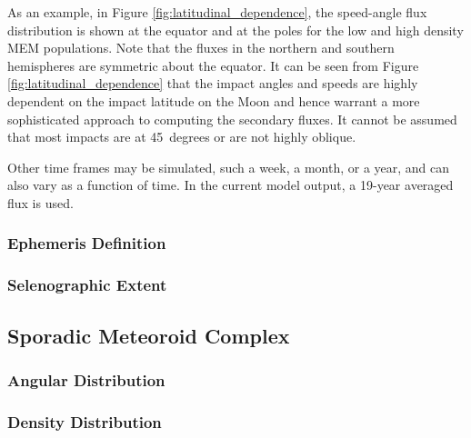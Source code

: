 \documentclass{article}
\begin{document}
As an example, in Figure \ref{fig:latitudinal_dependence}, the speed-angle flux distribution is shown at the equator and at the poles for the low and high density MEM populations. Note that the fluxes in the northern and southern hemispheres are symmetric about the equator. It can be seen from Figure \ref{fig:latitudinal_dependence} that the impact angles and speeds are highly dependent on the impact latitude on the Moon and hence warrant a more sophisticated approach to computing the secondary fluxes. It cannot be assumed that most impacts are at 45~degrees or are not highly oblique.%

Other time frames may be simulated, such a week, a month, or a year, and can also vary as a function of time. In the current model output, a 19-year averaged flux is used.


\subsubsection{Ephemeris Definition}


\subsubsection{Selenographic Extent}


\subsection{Sporadic Meteoroid Complex}

\subsubsection{Angular Distribution}


\subsubsection{Density Distribution}


\end{document}
